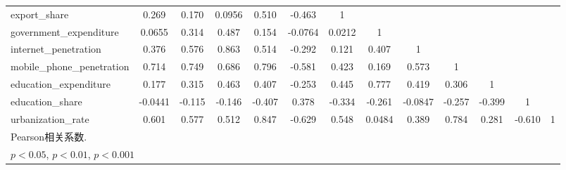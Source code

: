 \begin{table}[htbp]
{\begin{tabular}{l*{12}{c}}
export\_share&    0.269\sym{***}&    0.170\sym{***}&   0.0956         &    0.510\sym{***}&   -0.463\sym{***}&        1         &                  &                  &                  &                  &                  &                  \\
government\_expenditure&   0.0655         &    0.314\sym{***}&    0.487\sym{***}&    0.154\sym{**} &  -0.0764         &   0.0212         &        1         &                  &                  &                  &                  &                  \\
internet\_penetration&    0.376\sym{***}&    0.576\sym{***}&    0.863\sym{***}&    0.514\sym{***}&   -0.292\sym{***}&    0.121\sym{*}  &    0.407\sym{***}&        1         &                  &                  &                  &                  \\
mobile\_phone\_penetration&    0.714\sym{***}&    0.749\sym{***}&    0.686\sym{***}&    0.796\sym{***}&   -0.581\sym{***}&    0.423\sym{***}&    0.169\sym{***}&    0.573\sym{***}&        1         &                  &                  &                  \\
education\_expenditure&    0.177\sym{***}&    0.315\sym{***}&    0.463\sym{***}&    0.407\sym{***}&   -0.253\sym{***}&    0.445\sym{***}&    0.777\sym{***}&    0.419\sym{***}&    0.306\sym{***}&        1         &                  &                  \\
education\_share&  -0.0441         &   -0.115\sym{*}  &   -0.146\sym{**} &   -0.407\sym{***}&    0.378\sym{***}&   -0.334\sym{***}&   -0.261\sym{***}&  -0.0847         &   -0.257\sym{***}&   -0.399\sym{***}&        1         &                  \\
urbanization\_rate&    0.601\sym{***}&    0.577\sym{***}&    0.512\sym{***}&    0.847\sym{***}&   -0.629\sym{***}&    0.548\sym{***}&   0.0484         &    0.389\sym{***}&    0.784\sym{***}&    0.281\sym{***}&   -0.610\sym{***}&        1         \\
\hline\hline
\multicolumn{13}{l}{\footnotesize Pearson相关系数.}\\
\multicolumn{13}{l}{\footnotesize \sym{*} \(p<0.05\), \sym{**} \(p<0.01\), \sym{***} \(p<0.001\)}\\
\end{tabular}}
\end{table}
